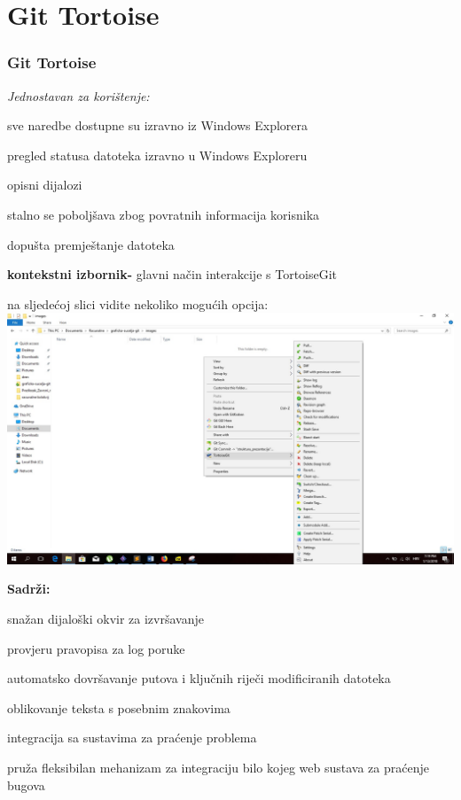 \section{Git Tortoise}
\begin{frame}[allowframebreaks]
\frametitle{Git Tortoise}
\begin{itemize}
\item \textit{Jednostavan za korištenje:}
{\setlength\itemindent{15pt}\item sve naredbe dostupne su izravno iz Windows Explorera}
{\setlength\itemindent{15pt}\item pregled statusa datoteka izravno u Windows Exploreru}
{\setlength\itemindent{15pt}\item opisni dijalozi}
{\setlength\itemindent{15pt}\item stalno se poboljšava zbog povratnih informacija korisnika}
{\setlength\itemindent{15pt}\item dopušta premještanje datoteka}
\framebreak
\item \textbf{kontekstni izbornik-} glavni način interakcije s TortoiseGit
 \item na sljedećoj slici vidite nekoliko mogućih opcija: 
 \includegraphics[width=0.8\linewidth]{images/git_tortoise.jpg}
 \framebreak
 \item \textbf{Sadrži:}
 {\setlength\itemindent{15pt}\item snažan dijaloški okvir za izvršavanje}
 {\setlength\itemindent{15pt}\item provjeru pravopisa za log poruke}
 {\setlength\itemindent{15pt}\item automatsko dovršavanje putova i ključnih riječi modificiranih datoteka}
 {\setlength\itemindent{15pt}\item oblikovanje teksta s posebnim znakovima}
 \framebreak
 \item integracija sa sustavima za praćenje problema
 \item pruža fleksibilan mehanizam za integraciju bilo kojeg web sustava za praćenje bugova

\end{itemize}
\end{frame}
